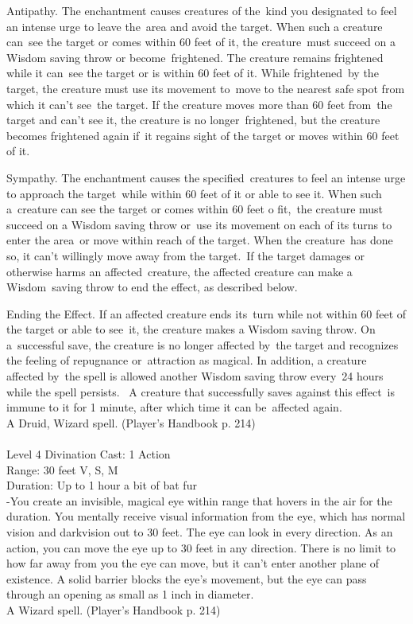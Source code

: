 \documentclass[10pt,twocolumn]{report}
\begin{document}
Antipathy. 
The enchantment causes creatures of the kind you designated to feel an intense urge to leave the area and avoid the target. When such a creature can see the target or comes within 60 feet of it, the creature must succeed on a Wisdom saving throw or become frightened. The creature remains frightened while it can see the target or is within 60 feet of it. While frightened by the target, the creature must use its movement to move to the nearest safe spot from which it can’t see the target. If the creature moves more than 60 feet from the target and can’t see it, the creature is no longer frightened, but the creature becomes frightened again if it regains sight of the target or moves within 60 feet of it. 

Sympathy. 
The enchantment causes the specified creatures to feel an intense urge to approach the target while within 60 feet of it or able to see it. When such a creature can see the target or comes within 60 feet o fit, the creature must succeed on a Wisdom saving throw or use its movement on each of its turns to enter the area or move within reach of the target. When the creature has done so, it can’t willingly move away from the target. If the target damages or otherwise harms an affected creature, the affected creature can make a Wisdom saving throw to end the effect, as described below. 

Ending the Effect. 
If an affected creature ends its turn while not within 60 feet of the target or able to see it, the creature makes a Wisdom saving throw. On a successful save, the creature is no longer affected by the target and recognizes the feeling of repugnance or attraction as magical. In addition, a creature affected by the spell is allowed another Wisdom saving throw every 24 hours while the spell persists. 
A creature that successfully saves against this effect is immune to it for 1 minute, after which time it can be affected again.\\
A Druid, Wizard spell. (Player's Handbook p. 214) \\


 \\
Level 4 \quad Divination \quad Cast: 1 Action\\
Range: 30 feet \quad V, S, M\\
Duration: Up to 1 hour \quad a bit of bat fur\\
-You create an invisible, magical eye within range that hovers in the air for the duration. 
You mentally receive visual information from the eye, which has normal vision and darkvision out to 30 feet. The eye can look in every direction. 
As an action, you can move the eye up to 30 feet in any direction. There is no limit to how far away from you the eye can move, but it can’t enter another plane of existence. A solid barrier blocks the eye’s movement, but the eye can pass through an opening as small as 1 inch in diameter.\\
A Wizard spell. (Player's Handbook p. 214) \\
\end{document}
